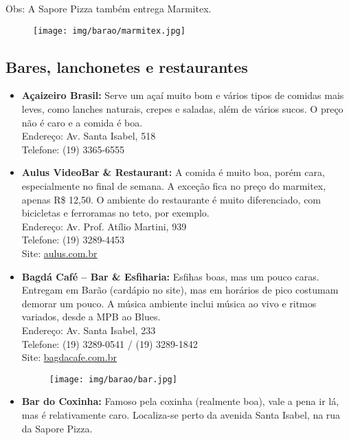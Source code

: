 Obs: A Sapore Pizza também entrega Marmitex.

\begin{figure}[h!]
    \centering
    \texttt{[image: img/barao/marmitex.jpg]}
\end{figure}

\subsection{Bares, lanchonetes e restaurantes}

\begin{itemize}
    \item   \textbf{Açaizeiro Brasil:} Serve um açaí muito bom e vários tipos de
        comidas mais leves, como lanches naturais, crepes e saladas, além de
        vários sucos. O preço não é caro e a comida é boa.
        \\Endereço: Av. Santa Isabel, 518
        \\Telefone: (19) 3365-6555 %

    \item   \textbf{Aulus VideoBar \& Restaurant:} A comida é muito boa, porém
        cara, especialmente no final de semana. A exceção fica no preço do
        marmitex, apenas R\$ 12,50. O ambiente do restaurante é muito diferenciado,
        com bicicletas e ferroramas no teto, por exemplo.
        \\Endereço: Av. Prof. Atílio Martini, 939
        \\Telefone: (19) 3289-4453
        \\Site: \url{aulus.com.br}

    \item   \textbf{Bagdá Café -- Bar \& Esfiharia:} Esfihas boas, mas um pouco
        caras. Entregam em Barão (cardápio no site), mas em horários de pico
        costumam demorar um pouco. A música ambiente inclui música ao vivo e
        ritmos variados, desde a MPB ao Blues.
        \\Endereço: Av. Santa Isabel, 233
        \\Telefone: (19) 3289-0541 / (19) 3289-1842
        \\Site: \url{bagdacafe.com.br}

\begin{figure}[h!]
    \centering
    \texttt{[image: img/barao/bar.jpg]}
\end{figure}

    \item   \textbf{Bar do Coxinha:} Famoso pela coxinha (realmente boa), vale a
        pena ir lá, mas é relativamente caro. Localiza-se perto da avenida Santa
        Isabel, na rua da Sapore Pizza.


\end{itemize}
